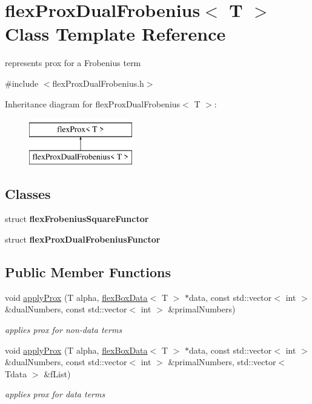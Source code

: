 \hypertarget{classflex_prox_dual_frobenius}{}\section{flex\+Prox\+Dual\+Frobenius$<$ T $>$ Class Template Reference}
\label{classflex_prox_dual_frobenius}


represents prox for a Frobenius term  




{\ttfamily \#include $<$flex\+Prox\+Dual\+Frobenius.\+h$>$}

Inheritance diagram for flex\+Prox\+Dual\+Frobenius$<$ T $>$\+:\begin{figure}[H]
\begin{center}
\leavevmode
\includegraphics[height=2.000000cm]{classflex_prox_dual_frobenius}
\end{center}
\end{figure}
\subsection*{Classes}
\begin{DoxyCompactItemize}
\item 
struct {\bfseries flex\+Frobenius\+Square\+Functor}
\item 
struct {\bfseries flex\+Prox\+Dual\+Frobenius\+Functor}
\end{DoxyCompactItemize}
\subsection*{Public Member Functions}
\begin{DoxyCompactItemize}
\item 
void \hyperlink{classflex_prox_dual_frobenius_a08de45a25d007ea87379641d027fd228}{apply\+Prox} (T alpha, \hyperlink{classflex_box_data}{flex\+Box\+Data}$<$ T $>$ $\ast$data, const std\+::vector$<$ int $>$ \&dual\+Numbers, const std\+::vector$<$ int $>$ \&primal\+Numbers)
\begin{DoxyCompactList}\small\item\em applies prox for non-\/data terms \end{DoxyCompactList}\item 
void \hyperlink{classflex_prox_dual_frobenius_a24695ced8a80693606e1654b04bd068f}{apply\+Prox} (T alpha, \hyperlink{classflex_box_data}{flex\+Box\+Data}$<$ T $>$ $\ast$data, const std\+::vector$<$ int $>$ \&dual\+Numbers, const std\+::vector$<$ int $>$ \&primal\+Numbers, std\+::vector$<$ Tdata $>$ \&f\+List)
\begin{DoxyCompactList}\small\item\em applies prox for data terms \end{DoxyCompactList}\end{DoxyCompactItemize}
